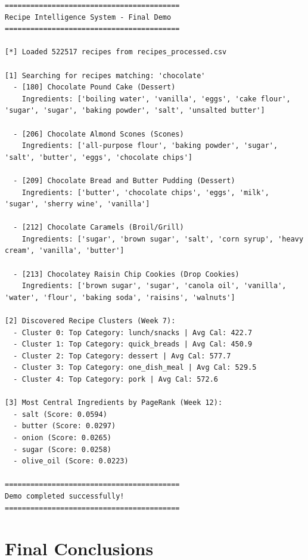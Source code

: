 \documentclass[11pt,a4paper]{article}
\begin{document}
\begin{verbatim}
=========================================
Recipe Intelligence System - Final Demo
=========================================

[*] Loaded 522517 recipes from recipes_processed.csv

[1] Searching for recipes matching: 'chocolate'
  - [180] Chocolate Pound Cake (Dessert)
    Ingredients: ['boiling water', 'vanilla', 'eggs', 'cake flour', 'sugar', 'sugar', 'baking powder', 'salt', 'unsalted butter']

  - [206] Chocolate Almond Scones (Scones)
    Ingredients: ['all-purpose flour', 'baking powder', 'sugar', 'salt', 'butter', 'eggs', 'chocolate chips']

  - [209] Chocolate Bread and Butter Pudding (Dessert)
    Ingredients: ['butter', 'chocolate chips', 'eggs', 'milk', 'sugar', 'sherry wine', 'vanilla']

  - [212] Chocolate Caramels (Broil/Grill)
    Ingredients: ['sugar', 'brown sugar', 'salt', 'corn syrup', 'heavy cream', 'vanilla', 'butter']

  - [213] Chocolatey Raisin Chip Cookies (Drop Cookies)
    Ingredients: ['brown sugar', 'sugar', 'canola oil', 'vanilla', 'water', 'flour', 'baking soda', 'raisins', 'walnuts']

[2] Discovered Recipe Clusters (Week 7):
  - Cluster 0: Top Category: lunch/snacks | Avg Cal: 422.7
  - Cluster 1: Top Category: quick_breads | Avg Cal: 450.9
  - Cluster 2: Top Category: dessert | Avg Cal: 577.7
  - Cluster 3: Top Category: one_dish_meal | Avg Cal: 529.5
  - Cluster 4: Top Category: pork | Avg Cal: 572.6

[3] Most Central Ingredients by PageRank (Week 12):
  - salt (Score: 0.0594)
  - butter (Score: 0.0297)
  - onion (Score: 0.0265)
  - sugar (Score: 0.0258)
  - olive_oil (Score: 0.0223)

=========================================
Demo completed successfully!
=========================================
\end{verbatim}

\section{Final Conclusions}
\end{document}
